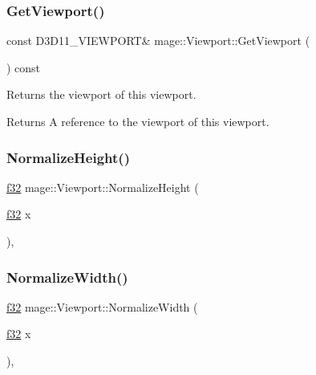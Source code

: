\hypertarget{structmage_1_1_viewport_ad4bb75cdfbd137182898caad913de4d1}{}\label{structmage_1_1_viewport_ad4bb75cdfbd137182898caad913de4d1} 
\subsubsection{\texorpdfstring{Get\+Viewport()}{GetViewport()}}
{\footnotesize\ttfamily const D3\+D11\+\_\+\+V\+I\+E\+W\+P\+O\+RT\& mage\+::\+Viewport\+::\+Get\+Viewport (\begin{DoxyParamCaption}{ }\end{DoxyParamCaption}) const\hspace{0.3cm}{\ttfamily [noexcept]}}

Returns the viewport of this viewport.

\begin{DoxyReturn}{Returns}
A reference to the viewport of this viewport. 
\end{DoxyReturn}
\hypertarget{structmage_1_1_viewport_a7ca3b41ed9c470c821c86dfd4158b80b}{}\label{structmage_1_1_viewport_a7ca3b41ed9c470c821c86dfd4158b80b} 
\subsubsection{\texorpdfstring{Normalize\+Height()}{NormalizeHeight()}}
{\footnotesize\ttfamily \hyperlink{namespacemage_a6a44ad388483959dc4dff9f2aef91431}{f32} mage\+::\+Viewport\+::\+Normalize\+Height (\begin{DoxyParamCaption}\item[{\hyperlink{namespacemage_a6a44ad388483959dc4dff9f2aef91431}{f32}}]{x }\end{DoxyParamCaption})\hspace{0.3cm}{\ttfamily [static]}, {\ttfamily [noexcept]}}

\hypertarget{structmage_1_1_viewport_ae4ab5c7e81795c3ff98472e1a7786ef6}{}\label{structmage_1_1_viewport_ae4ab5c7e81795c3ff98472e1a7786ef6} 
\subsubsection{\texorpdfstring{Normalize\+Width()}{NormalizeWidth()}}
{\footnotesize\ttfamily \hyperlink{namespacemage_a6a44ad388483959dc4dff9f2aef91431}{f32} mage\+::\+Viewport\+::\+Normalize\+Width (\begin{DoxyParamCaption}\item[{\hyperlink{namespacemage_a6a44ad388483959dc4dff9f2aef91431}{f32}}]{x }\end{DoxyParamCaption})\hspace{0.3cm}{\ttfamily [static]}, {\ttfamily [noexcept]}}

